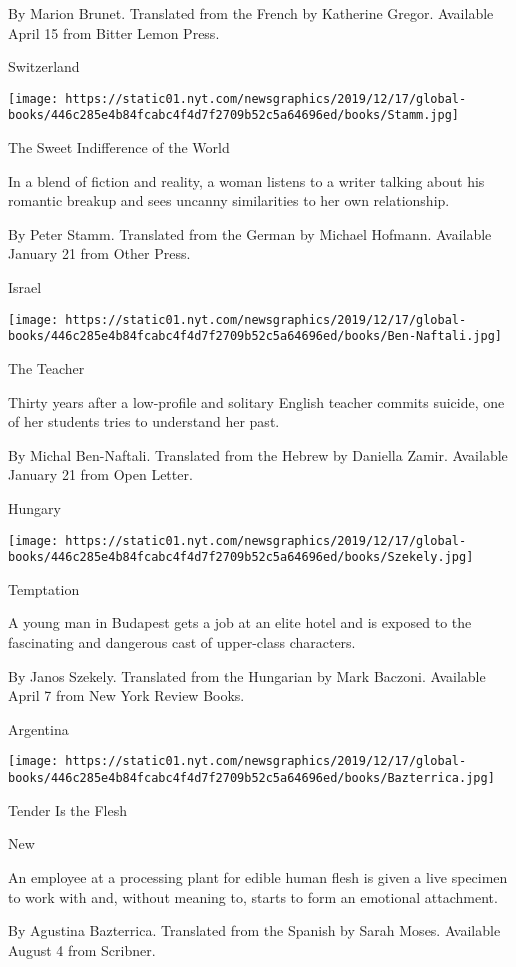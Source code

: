 By Marion Brunet. Translated from the French by Katherine Gregor.
Available April 15 from Bitter Lemon Press.

Switzerland

\texttt{[image: https://static01.nyt.com/newsgraphics/2019/12/17/global-books/446c285e4b84fcabc4f4d7f2709b52c5a64696ed/books/Stamm.jpg]}

The Sweet Indifference of the World

In a blend of fiction and reality, a woman listens to a writer talking
about his romantic breakup and sees uncanny similarities to her own
relationship.

 By Peter Stamm. Translated from the German by Michael Hofmann.
Available January 21 from Other Press.

Israel

\texttt{[image: https://static01.nyt.com/newsgraphics/2019/12/17/global-books/446c285e4b84fcabc4f4d7f2709b52c5a64696ed/books/Ben-Naftali.jpg]}

The Teacher

Thirty years after a low-profile and solitary English teacher commits
suicide, one of her students tries to understand her past.

 By Michal Ben-Naftali. Translated from the Hebrew by Daniella Zamir.
Available January 21 from Open Letter.

Hungary

\texttt{[image: https://static01.nyt.com/newsgraphics/2019/12/17/global-books/446c285e4b84fcabc4f4d7f2709b52c5a64696ed/books/Szekely.jpg]}

Temptation

A young man in Budapest gets a job at an elite hotel and is exposed to
the fascinating and dangerous cast of upper-class characters.

 By Janos Szekely. Translated from the Hungarian by Mark Baczoni.
Available April 7 from New York Review Books.

Argentina

\texttt{[image: https://static01.nyt.com/newsgraphics/2019/12/17/global-books/446c285e4b84fcabc4f4d7f2709b52c5a64696ed/books/Bazterrica.jpg]}

Tender Is the Flesh

New

An employee at a processing plant for edible human flesh is given a live
specimen to work with and, without meaning to, starts to form an
emotional attachment.

 By Agustina Bazterrica. Translated from the Spanish by Sarah Moses.
Available August 4 from Scribner.

